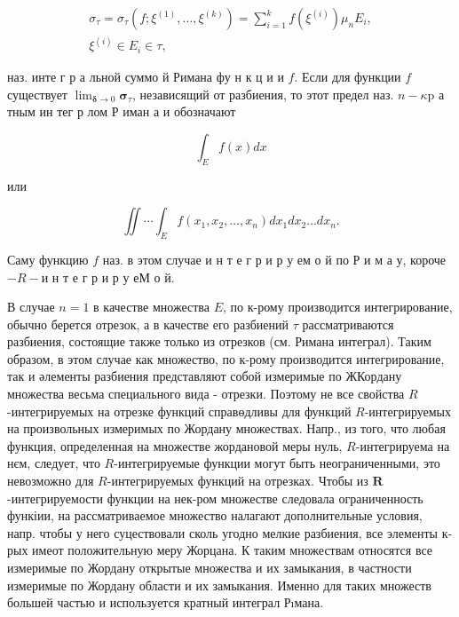 \documentclass[10pt]{article}
\begin{document}
\[

\begin{gathered}

\sigma_{\tau}=\sigma_{\tau}\left(f ; \xi^{(1)}, \ldots, \xi^{(k)}\right)=\sum_{i=1}^{k} f\left(\xi^{(i)}\right) \mu_{n} E_{i}, \\

\xi^{(i)} \in E_{i} \in \tau,

\end{gathered}

\]



наз. инте г р а льной суммо й Римана $ф \mathbf{у}$ н к ц и и $f$. Если для функции $f$ существует $\lim _{\boldsymbol{\delta} \rightarrow 0} \boldsymbol{\sigma}_{\tau}$, независящий от разбиения, то этот предел наз. $n-\kappa \mathrm{p}$ а тным ин тег р лом Р иман а и обозначают



\[

\int_{E} f(x) d x

\]



или



\[

\iint \cdots \int_{E} f\left(x_{1}, x_{2}, \ldots, x_{n}\right) d x_{1} d x_{2} \ldots d x_{n} .

\]



Саму функцию $f$ наз. в этом случае и н т е г р и р у ем о й по Р и м а у, короче $-R-и$ н т е г р и р у еМ $о$ й.



В случае $n=1$ в качестве множества $E$, по к-рому производится интегрирование, обычно берется отрезок, а в качестве его разбиений $\tau$ рассматриваются разбиения, состоящие также только из отрезков (см. Римана интеграл). Таким образом, в этом случае как множество, по к-рому производится интегрирование, так и әлементы разбиения представляют собой измеримые по ЖКордану множества весьма специального вида - отрезки. Поэтому не все свойства $R$-интегрируемых на отрезке функций справөдливы для функций $R$-интегрируемых на произвольных измеримых по Жордану множествах. Напр., из того, что любая функция, определенная на множестве жордановой меры нуль, $R$-интегрируема на нєм, следует, что $R$-интегрируемые функции могут быть неограниченными, это невозможно для $R$-интегрируемых функций на отрезках. Чтобы из $\boldsymbol{R}$-интегрируемости функции на нек-ром множестве следовала ограниченность функіии, на рассматриваемое множество налагают дополнительные условия, напр. чтобы у него суцествовали сколь угодно мелкие разбиения, все элементы к-рых имеот положительную меру Жорцана. К таким множествам относятся все измеримые по Жордану открытые множества и их замыкания, в частности измеримые по Жордану области и их замыкания. Именно для таких множеств большей частью и используется кратный интеграл Рıмана.
\end{document}
